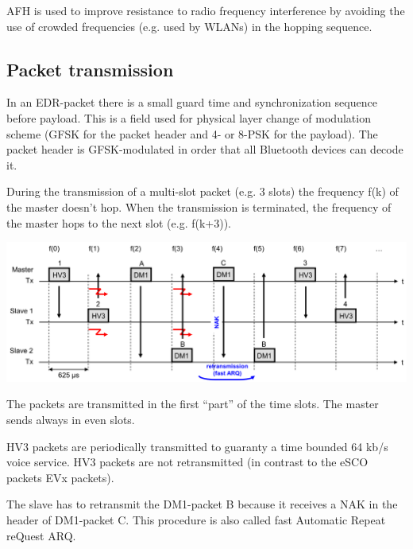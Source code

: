 	AFH is used to improve resistance to radio frequency interference by avoiding the use of crowded frequencies
	(e.g. used by WLANs) in the hopping sequence.

\subsection{Packet transmission}
	In an EDR-packet there is a small guard time and synchronization sequence before payload. This is 
	a field used for physical layer change of modulation scheme (GFSK for the packet header and 4- or 8-PSK 
	for the payload). The packet header is GFSK-modulated in order that all Bluetooth devices can decode it.
	
	During the transmission of a multi-slot packet (e.g. 3 slots) the frequency f(k) of the master doesn't hop. When 
	the transmission is terminated, the frequency of the master hops to the next slot (e.g. f(k+3)).
	
	\begin{minipage}{16cm}
		\includegraphics[width=16cm]{./bilder/bt-packet-transmission.png} 
	\end{minipage}

	The packets are transmitted in the first “part” of the time slots. The master sends always 
	in even slots. 

	HV3 packets are periodically transmitted to guaranty a time bounded 64 kb/s voice 
	service. HV3 packets are not retransmitted (in contrast to the eSCO packets EVx 
	packets). 

	The slave has to retransmit the DM1-packet B because it receives a NAK in the header 
	of DM1-packet C. This procedure is also called fast Automatic Repeat reQuest ARQ. 

	
	